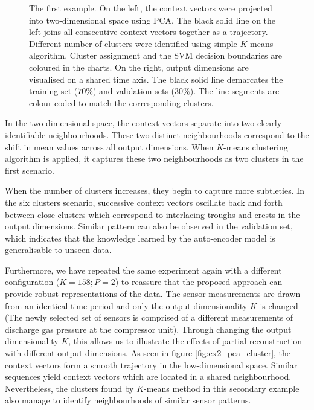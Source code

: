 \documentclass[runningheads]{llncs}
\begin{document}
\begin{figure}[H]
	\caption{The first example. On the left, the context vectors were projected into two-dimensional space using PCA. The black solid line on the left joins all consecutive context vectors together as a trajectory. Different number of clusters were identified using simple \(K\)-means algorithm. Cluster assignment and the SVM decision boundaries are coloured in the charts. On the right, output dimensions are visualised on a shared time axis. The black solid line demarcates the training set (\(70\%\)) and validation sets (\(30\%\)). The line segments are colour-coded to match the corresponding clusters.}
	\label{fig:pca_cluster}
\end{figure}


In the two-dimensional space, the context vectors separate into two clearly identifiable neighbourhoods. These two distinct neighbourhoods correspond to the shift in mean values across all output dimensions. When \(K\)-means clustering algorithm is applied, it captures these two neighbourhoods as two clusters in the first scenario.

When the number of clusters increases, they begin to capture more subtleties. In the six clusters scenario, successive context vectors oscillate back and forth between close clusters which correspond to interlacing troughs and crests in the output dimensions. Similar pattern can also be observed in the validation set, which indicates that the knowledge learned by the auto-encoder model is generalisable to unseen data.

Furthermore, we have repeated the same experiment again with a different configuration (\(K=158; P=2\)) to reassure that the proposed approach can provide robust representations of the data. The sensor measurements are drawn from an identical time period and only the output dimensionality \(K\) is changed (The newly selected set of sensors is comprised of a different measurements of discharge gas pressure at the compressor unit). Through changing the output dimensionality \(K\), this allows us to illustrate the effects of partial reconstruction with different output dimensions. As seen in figure \ref{fig:ex2_pca_cluster}, the context vectors form a smooth trajectory in the low-dimensional space. Similar sequences yield context vectors which are located in a shared neighbourhood. Nevertheless, the clusters found by \(K\)-means method in this secondary example also manage to identify neighbourhoods of similar sensor patterns.
\end{document}
